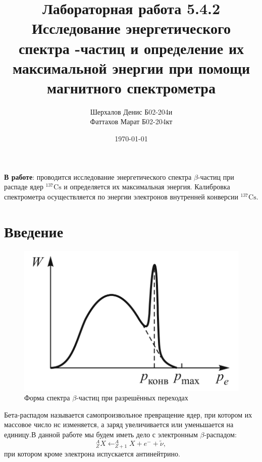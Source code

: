 \documentclass[a4paper,12pt]{article}
\title{Лабораторная работа 5.4.2 \\
	\textbf{Исследование энергетического спектра \btt-частиц и определение их максимальной энергии при помощи	магнитного спектрометра}}
\author{Шерхалов Денис Б02-204и \\
		Фаттахов Марат Б02-204кт}
\date{\today}
\theoremstyle{definition}
\newcommand{\isotope}[2]{$ ^{#2}\mathrm{#1} $}
\newcommand{\btt}{$\beta $}
\begin{document}
		
	{\Large \maketitle}

	\textbf{В работе}: проводится исследование энергетического	спектра \btt-частиц при распаде ядер \isotope{Cs}{137} и определяется их максимальная энергия. Калибровка спектрометра осуществляется по энергии электронов внутренней конверсии \isotope{Cs}{137}.
	
	\section{Введение}
	
	\begin{figure}
		\includegraphics[width=1.0\linewidth]{Screenshot_1}
		\caption{Форма спектра \btt-частиц при разрешённых переходах}
		\label{fig:screenshot1}
	\end{figure}
	
	Бета-распадом называется самопроизвольное превращение ядер,	при котором их массовое число нс изменяется, а заряд увеличивается или уменьшается на единицу.В данной работе мы будем иметь дело с электронным \btt-распадом:
	\begin{equation*}
		^A_Z X \leftarrow ^A_{Z+1} X+e^-+\widetilde{\nu},
	\end{equation*}
	при котором кроме электрона испускается антинейтрино. 
	
\end{document}
